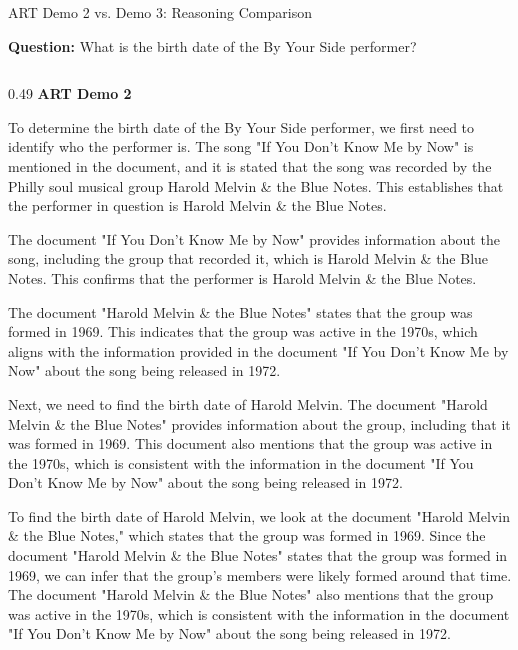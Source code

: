 \begin{frame}{ART Demo 2 vs. Demo 3: Reasoning Comparison}

\scriptsize

\textbf{Question:} What is the birth date of the By Your Side performer?

\vspace{0.1cm}

\begin{columns}[T,onlytextwidth]

    \begin{column}{0.49\textwidth}
        \centering
        \textbf{ART Demo 2}
        \vspace{0.08cm}

        \begin{block}{}
            \tiny
            To determine the birth date of the By Your Side performer, we first need to identify who the performer is. The song "If You Don't Know Me by Now" is mentioned in the document, and it is stated that the song was recorded by the Philly soul musical group Harold Melvin \& the Blue Notes. This establishes that the performer in question is Harold Melvin \& the Blue Notes.

            The document "If You Don't Know Me by Now" provides information about the song, including the group that recorded it, which is Harold Melvin \& the Blue Notes. This confirms that the performer is Harold Melvin \& the Blue Notes.

            The document "Harold Melvin \& the Blue Notes" states that the group was formed in 1969. This indicates that the group was active in the 1970s, which aligns with the information provided in the document "If You Don't Know Me by Now" about the song being released in 1972.

            Next, we need to find the birth date of Harold Melvin. The document "Harold Melvin \& the Blue Notes" provides information about the group, including that it was formed in 1969. This document also mentions that the group was active in the 1970s, which is consistent with the information in the document "If You Don't Know Me by Now" about the song being released in 1972.

            To find the birth date of Harold Melvin, we look at the document "Harold Melvin \& the Blue Notes," which states that the group was formed in 1969. Since the document "Harold Melvin \& the Blue Notes" states that the group was formed in 1969, we can infer that the group's members were likely formed around that time. The document "Harold Melvin \& the Blue Notes" also mentions that the group was active in the 1970s, which is consistent with the information in the document "If You Don't Know Me by Now" about the song being released in 1972.


\end{block}
\end{column}
\end{columns}
\end{frame}
